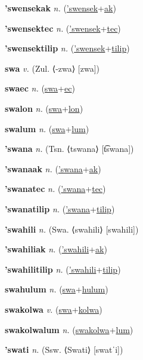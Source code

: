 \textbf{\hypertarget{'swensekak}{'swensekak}} \textit{n.} (\hyperlink{'swensek}{'swensek}+\allowbreak \hyperlink{ak}{ak})


\textbf{\hypertarget{'swensektec}{'swensektec}} \textit{n.} (\hyperlink{'swensek}{'swensek}+\allowbreak \hyperlink{tec}{tec})


\textbf{\hypertarget{'swensektilip}{'swensektilip}} \textit{n.} (\hyperlink{'swensek}{'swensek}+\allowbreak \hyperlink{tilip}{tilip})


\textbf{\hypertarget{swa}{swa}} \textit{v.} (Zul. ⟨-zwa⟩ [zwa])


\textbf{\hypertarget{swaec}{swaec}} \textit{n.} (\hyperlink{swa}{swa}+\allowbreak \hyperlink{ec}{ec})


\textbf{\hypertarget{swalon}{swalon}} \textit{n.} (\hyperlink{swa}{swa}+\allowbreak \hyperlink{lon}{lon})


\textbf{\hypertarget{swalum}{swalum}} \textit{n.} (\hyperlink{swa}{swa}+\allowbreak \hyperlink{lum}{lum})


\textbf{\hypertarget{'swana}{'swana}} \textit{n.} (Tsn. ⟨tswana⟩ [t͡swana])


\textbf{\hypertarget{'swanaak}{'swanaak}} \textit{n.} (\hyperlink{'swana}{'swana}+\allowbreak \hyperlink{ak}{ak})


\textbf{\hypertarget{'swanatec}{'swanatec}} \textit{n.} (\hyperlink{'swana}{'swana}+\allowbreak \hyperlink{tec}{tec})


\textbf{\hypertarget{'swanatilip}{'swanatilip}} \textit{n.} (\hyperlink{'swana}{'swana}+\allowbreak \hyperlink{tilip}{tilip})


\textbf{\hypertarget{'swahili}{'swahili}} \textit{n.} (Swa. ⟨swahili⟩ [swahili])


\textbf{\hypertarget{'swahiliak}{'swahiliak}} \textit{n.} (\hyperlink{'swahili}{'swahili}+\allowbreak \hyperlink{ak}{ak})


\textbf{\hypertarget{'swahilitilip}{'swahilitilip}} \textit{n.} (\hyperlink{'swahili}{'swahili}+\allowbreak \hyperlink{tilip}{tilip})


\textbf{\hypertarget{swahulum}{swahulum}} \textit{n.} (\hyperlink{swa}{swa}+\allowbreak \hyperlink{hulum}{hulum})


\textbf{\hypertarget{swakolwa}{swakolwa}} \textit{v.} (\hyperlink{swa}{swa}+\allowbreak \hyperlink{kolwa}{kolwa})


\textbf{\hypertarget{swakolwalum}{swakolwalum}} \textit{n.} (\hyperlink{swakolwa}{swakolwa}+\allowbreak \hyperlink{lum}{lum})


\textbf{\hypertarget{'swati}{'swati}} \textit{n.} (Ssw. ⟨Swati⟩ [swatˈi])


